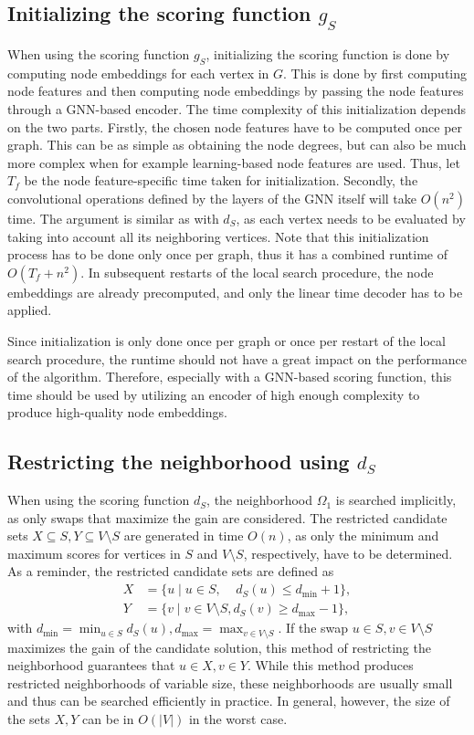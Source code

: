 \documentclass[draft,final]{vutinfth} %
\begin{document}
\subsection{Initializing the scoring function $g_S$}

When using the scoring function $g_S$, initializing the scoring function is done by computing node embeddings for each vertex in $G$. This is done by first computing node features and then computing node embeddings by passing the node features through a GNN-based encoder. The time complexity of this initialization depends on the two parts. Firstly, the chosen node features have to be computed once per graph. This can be as simple as obtaining the node degrees, but can also be much more complex when for example learning-based node features are used. Thus, let $T_f$ be the node feature-specific time taken for initialization.  Secondly, the convolutional operations defined by the layers of the GNN itself will take $O(n^2)$ time. The argument is similar as with $d_S$, as each vertex needs to be evaluated by taking into account all its neighboring vertices. 
Note that this initialization process has to be done only once per graph, thus it has a combined runtime of $O(T_f + n^2)$. In subsequent restarts of the local search procedure, the node embeddings are already precomputed, and only the linear time decoder has to be applied. 

Since initialization is only done once per graph or once per restart of the local search procedure, the runtime should not have a great impact on the performance of the algorithm. Therefore, especially with a GNN-based scoring function, this time should be used by utilizing an encoder of high enough complexity to produce high-quality node embeddings. 

\subsection{Restricting the neighborhood using $d_S$}
When using the scoring function $d_S$, the neighborhood $\Omega_1$ is searched implicitly, as only swaps that maximize the gain are considered. 
The restricted candidate sets $X \subseteq S, Y \subseteq V \setminus S$ are generated in time $O(n)$, as only the minimum and maximum scores for vertices in $S$ and $V \setminus S$, respectively, have to be determined. As a reminder, the restricted candidate sets are defined as 
\begin{align*}
    X &= \{ u \mid u \in S,~~~~~ d_S(u) \leq d_{\min} + 1 \}, \\
    Y &= \{ v \mid v \in V \setminus S, d_S(v) \geq d_{\max} - 1 \},
\end{align*}
with $d_{\min} = \min_{u \in S} d_S(u), d_{\max} = \max_{v \in V \setminus S}$. 
If the swap $u \in S,v \in V \setminus S$ maximizes the gain of the candidate solution, this method of restricting the neighborhood guarantees that $u \in X, v \in Y$.
While this method produces restricted neighborhoods of variable size, these neighborhoods are usually small and thus can be searched efficiently in practice. In general, however, the size of the sets $X, Y$ can be in $O(|V|)$ in the worst case. 
\end{document}
